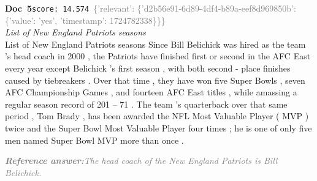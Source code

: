 \documentclass[a4paper,11pt]{article}
\begin{document}
\begin{docenv}
{\footnotesize\textcolor{doccolor}{\textbf{Doc~5}}}\hfill{\tiny\texttt{score:~14.574}}\ {\tiny\textcolor{gray}{\{'relevant': \{'d2b56e91-6d89-4df4-b89a-eef8d969850b': \{'value': 'yes', 'timestamp': 1724782338\}\}\}}}\\[3pt]
{\small\textit{List of New England Patriots seasons}}\\[2pt]
\vspace{2pt}
{\footnotesize List of New England Patriots seasons
Since Bill Belichick was hired as the team 's head coach in 2000 , the Patriots have finished first or second in the AFC East every year except Belichick 's first season , with both second - place finishes caused by tiebreakers . Over that time , they have won five Super Bowls , seven AFC Championship Games , and fourteen AFC East titles , while amassing a regular season record of 201 -- 71 . The team 's quarterback over that same period , Tom Brady , has been awarded the NFL Most Valuable Player ( MVP ) twice and the Super Bowl Most Valuable Player four times ; he is one of only five men named Super Bowl MVP more than once .}
\end{docenv}
\begin{refanswerenv}
{\footnotesize\textit{\textcolor{gray}{\textbf{Reference answer:}\enspace The head coach of the New England Patriots is Bill Belichick.}}}
\end{refanswerenv}
\end{document}
